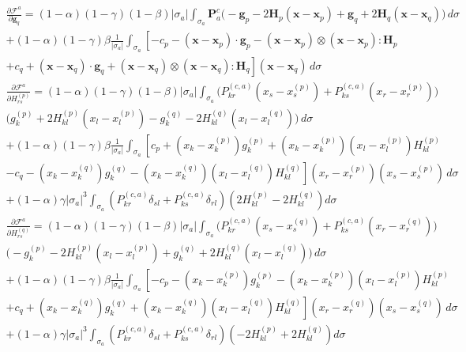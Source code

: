 \documentclass[11pt]{article} %
\begin{document}
\begin{eqnarray}
	\frac{\partial \mathcal{F}^a}{\partial \mathbf{g}_q} = (1-\alpha)(1-\gamma)(1-\beta) | \sigma_a | \int_{\sigma_a} \mathbf{P}^c_a \bigg( - \mathbf{g}_p - 2 \mathbf{H}_p (\mathbf{x} - \mathbf{x}_p) + \mathbf{g}_q + 2 \mathbf{H}_q (\mathbf{x} - \mathbf{x}_q) \bigg) \, d \sigma \nonumber \\ + (1-\alpha) (1-\gamma) \beta \frac{1}{| \sigma_a |} \int_{\sigma_a} \left[ - c_p - (\mathbf{x} - \mathbf{x}_p) \cdot \mathbf{g}_p - (\mathbf{x} - \mathbf{x}_p) \otimes (\mathbf{x} - \mathbf{x}_p) \colon \mathbf{H}_p \right. \nonumber \\ \left. + c_q + (\mathbf{x} - \mathbf{x}_q) \cdot \mathbf{g}_q + (\mathbf{x} - \mathbf{x}_q) \otimes (\mathbf{x} - \mathbf{x}_q) \colon \mathbf{H}_q \right] (\mathbf{x} - \mathbf{x}_q) \, d \sigma
\end{eqnarray}
\begin{eqnarray}
	\frac{\partial \mathcal{F}^a}{\partial H^{(p)}_{rs}} = (1-\alpha)(1-\gamma)(1-\beta) | \sigma_a | \int_{\sigma_a} \bigg( P^{(c,a)}_{kr} (x_s - x^{(p)}_s) + P^{(c,a)}_{ks} (x_r - x^{(p)}_r) \bigg) \nonumber \\ \bigg( g^{(p)}_k + 2 H^{(p)}_{kl} (x_l - x^{(p)}_l) - g^{(q)}_k - 2 H^{(q)}_{kl} (x_l - x^{(q)}_l) \bigg) \, d \sigma \nonumber \\ + (1-\alpha) (1-\gamma) \beta \frac{1}{| \sigma_a |} \int_{\sigma_a} \left[ c_p + (x_k - x^{(p)}_k) g^{(p)}_k + (x_k - x^{(p)}_k) (x_l - x^{(p)}_l) H^{(p)}_{kl} \right. \nonumber \\ \left. - c_q - (x_k - x^{(q)}_k) g^{(q)}_k - (x_k - x^{(q)}_k) (x_l - x^{(q)}_l) H^{(q)}_{kl} \right] (x_r - x^{(p)}_r) (x_s - x^{(p)}_s) \, d \sigma \nonumber \\ + (1-\alpha) \gamma | \sigma_a |^3 \int_{\sigma_a} (P^{(c,a)}_{kr} \delta_{sl} + P^{(c,a)}_{ks} \delta_{rl}) ( 2 H^{(p)}_{kl} - 2 H^{(q)}_{kl} ) d \sigma
\end{eqnarray}
\begin{eqnarray}
	\frac{\partial \mathcal{F}^a}{\partial H^{(q)}_{rs}} = (1-\alpha)(1-\gamma)(1-\beta) | \sigma_a | \int_{\sigma_a} \bigg( P^{(c,a)}_{kr} (x_s - x^{(q)}_s) + P^{(c,a)}_{ks} (x_r - x^{(q)}_r) \bigg) \nonumber \\ \bigg( - g^{(p)}_k - 2 H^{(p)}_{kl} (x_l - x^{(p)}_l) + g^{(q)}_k + 2 H^{(q)}_{kl} (x_l - x^{(q)}_l) \bigg) \, d \sigma \nonumber \\ + (1-\alpha) (1-\gamma) \beta \frac{1}{| \sigma_a |} \int_{\sigma_a} \left[ - c_p - (x_k - x^{(p)}_k) g^{(p)}_k - (x_k - x^{(p)}_k) (x_l - x^{(p)}_l) H^{(p)}_{kl} \right. \nonumber \\ \left. + c_q + (x_k - x^{(q)}_k) g^{(q)}_k + (x_k - x^{(q)}_k) (x_l - x^{(q)}_l) H^{(q)}_{kl} \right] (x_r - x^{(q)}_r) (x_s - x^{(q)}_s) \, d \sigma \nonumber \\ + (1-\alpha) \gamma | \sigma_a |^3 \int_{\sigma_a} (P^{(c,a)}_{kr} \delta_{sl} + P^{(c,a)}_{ks} \delta_{rl}) ( - 2 H^{(p)}_{kl} + 2 H^{(q)}_{kl} ) d \sigma
\end{eqnarray}
\end{document}
